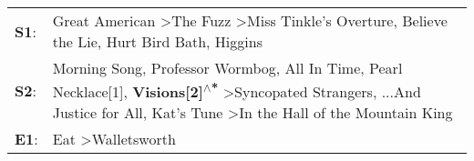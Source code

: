 \begin{supertabular}{p{0.03\textwidth}p{0.92\textwidth}}
 \textbf{S1}:  &                                                                                                                                                                                  Great American\textsuperscript{} \textgreater \enspace The Fuzz\textsuperscript{} \textgreater \enspace Miss Tinkle's Overture\textsuperscript{}, \enspace Believe the Lie\textsuperscript{}, \enspace Hurt Bird Bath\textsuperscript{}, \enspace Higgins\textsuperscript{}  \enspace  \\
 \textbf{S2}:  &  Morning Song\textsuperscript{}, \enspace Professor Wormbog\textsuperscript{}, \enspace All In Time\textsuperscript{}, \enspace Pearl Necklace[1]\textsuperscript{}, \enspace \textbf{Visions[2]\textsuperscript{$\wedge$*}} \textgreater \enspace Syncopated Strangers\textsuperscript{}, \enspace ...And Justice for All\textsuperscript{}, \enspace Kat's Tune\textsuperscript{} \textgreater \enspace In the Hall of the Mountain King\textsuperscript{}  \enspace  \\
 \textbf{E1}:  &                                                                                                                                                                                                                                                                                                                                                                                   Eat\textsuperscript{} \textgreater \enspace Walletsworth\textsuperscript{}  \enspace  \\
\end{supertabular}
